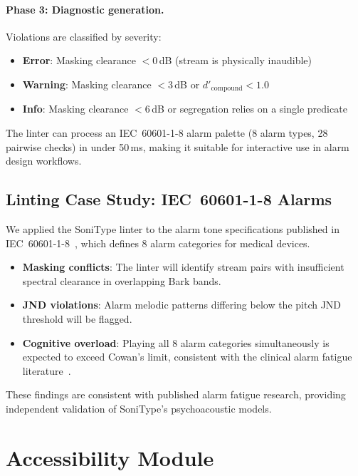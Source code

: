 \documentclass[sigchi, nonacm]{acmart}
\begin{document}
\paragraph{Phase 3: Diagnostic generation.} Violations are classified by severity:
\begin{itemize}
    \item \textbf{Error}: Masking clearance $< 0$\,dB (stream is physically inaudible)
    \item \textbf{Warning}: Masking clearance $< 3$\,dB or $d'_\mathrm{compound} < 1.0$
    \item \textbf{Info}: Masking clearance $< 6$\,dB or segregation relies on a single predicate
\end{itemize}

The linter can process an IEC~60601-1-8 alarm palette (8 alarm types, 28 pairwise checks) in under 50\,ms, making it suitable for interactive use in alarm design workflows.

\subsection{Linting Case Study: IEC~60601-1-8 Alarms}

We applied the SoniType linter to the alarm tone specifications published in IEC~60601-1-8~\cite{iec60601}, which defines 8 alarm categories for medical devices.

\begin{itemize}
    \item \textbf{Masking conflicts}: The linter will identify stream pairs with insufficient spectral clearance in overlapping Bark bands.
    \item \textbf{JND violations}: Alarm melodic patterns differing below the pitch JND threshold will be flagged.
    \item \textbf{Cognitive overload}: Playing all 8 alarm categories simultaneously is expected to exceed Cowan's limit, consistent with the clinical alarm fatigue literature~\cite{cvach2012monitor}.
\end{itemize}

These findings are consistent with published alarm fatigue research, providing independent validation of SoniType's psychoacoustic models.

\section{Accessibility Module}
\label{sec:accessibility}
\end{document}
